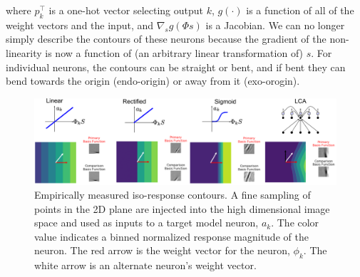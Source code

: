 where $p_{k}^\top$ is a one-hot vector selecting output $k$, $g(\cdot)$ is a function of all of the weight vectors and the input, and $\nabla_{s}g(\Phi s)$ is a Jacobian. We can no longer simply describe the contours of these neurons because the gradient of the non-linearity is now a function of (an arbitrary linear transformation of) $s$. For individual neurons, the contours can be straight or bent, and if bent they can bend towards the origin (endo-origin) or away from it (exo-orogin).

\begin{figure}[h]
\begin{center}
\centerline{\includegraphics[width=\columnwidth]{Figures/iso_contour_comparison.png}}
\end{center}
\caption{Empirically measured iso-response contours. A fine sampling of points in the 2D plane are injected into the high dimensional image space and used as inputs to a target model neuron, $a_{k}$. The color value indicates a binned normalized response magnitude of the neuron. The red arrow is the weight vector for the neuron, $\phi_{k}$. The white arrow is an alternate neuron's weight vector.}
\label{fig:iso_contours}
\end{figure}


